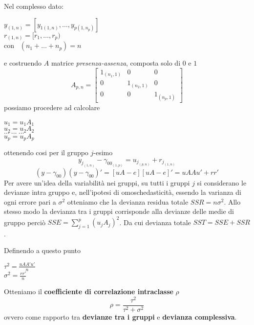 \documentclass[a4page, 11pt]{article} %
\begin{document}
Nel complesso dato:
\begin{center}
$y_{(1,n)} = [y_{1(1,n)},\dots,y_{p(1,n_p)}]$ \\
$r_{(1,n)}=[r_1,\dots,r_p)$ \\
con \  $(n_1+\dots+n_p) = n$
\end{center}
e costruendo $A$ matrice \textit{presenza-assenza}, composta solo di $0$ e $1$
\[A_{p,n}=
\begin{bmatrix}
1_{(n_{1},1)} & 0&0 \\
0&1_{(n_{2},1)}&0 \\
0&0&1_{(n_{p},1)}
\end{bmatrix}
\]
possiamo procedere ad calcolare
\begin{center}
$u_1= u_1 A_1$ \\
$u_2 = u_2 A_2$ \\
$\dots \ \dots \ \dots$ \\
$u_p = u_p A_p$
\end{center}
ottenendo cosi per il gruppo $j$-esimo
\begin{equation*}
y_{j_{(1,n)}} -\gamma_{00_{(1,p)}} = u_{j_{(p,n)}} + r_{j_{(1,n)}}
\end{equation*}
\begin{equation*}
(y-\gamma_{00})(y-\gamma_{00})' = [uA-e][uA-e]' = uAAu'+rr'
\end{equation*}
Per avere un'idea della variabilità nei gruppi, su tutti i gruppi $j$ si considerano le devianze intra gruppo e, nell'ipotesi di omoschedasticità, essendo la varianza di ogni errore pari a $\sigma^2$ otteniamo che la devianza residua totale $SSR = n\sigma^2$.
\newline
\newline
Allo stesso modo la devianza tra i gruppi corrisponde alla devianze delle medie di gruppo perciò $SSE = \sum^p_{j=1} (u_j A_j)^2$.
\newline
\newline
Da cui devianza totale $SST = SSE + SSR$.

Definendo a questo punto
\begin{center}
$\tau^2 = \frac{uAA'u'}{n}$ \\
$\sigma^2 = \frac{rr'}{n}$
\end{center}
Otteniamo il \textbf{coefficiente di correlazione intraclasse} $\rho$
\begin{equation*}
\rho = \frac{\tau^2}{\tau^2 + \sigma^2}
\end{equation*}
ovvero come rapporto tra \textbf{devianze tra i gruppi} e \textbf{devianza complessiva}.
\end{document}
